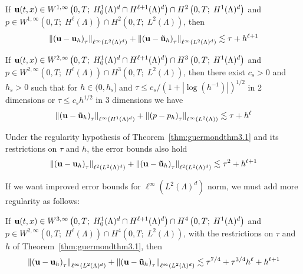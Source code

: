 \documentclass[letterpaper]{erdc}
\begin{document}
\begin{theorem}\label{thm:guermondthm3.1}
If $\textbf{u}(t,x)\in W^{1,\infty}\left(0,T;\; H_0^1(\Lambda)^d \cap H^{\ell+1}(\Lambda)^d  \right) \cap H^2\left(0,T;\; H^1(\Lambda)^d\right)$ and $p\in W^{1,\infty}\left(0,T;\; H^{\ell}(\Lambda) \right)\cap H^2\left(0,T;\; L^2(\Lambda)\right)$, then
  \begin{equation}
    \left\| \left(\textbf{u} - \textbf{u}_h \right)_{\tau} \right\|_{\ell^{\infty}\left(L^2(\Lambda)^d\right)} + \left\| \left(\textbf{u} - \mathbf{\tilde{u}}_h \right)_{\tau} \right\|_{\ell^{\infty}\left(L^2(\Lambda)^d\right)} \lesssim \tau + h^{\ell+1}
  \end{equation}
\end{theorem}

\begin{theorem}\label{thm:guermondthm3.2}
If $\textbf{u}(t,x)\in W^{2,\infty}\left(0,T;\; H_0^1(\Lambda)^d \cap H^{\ell+1}(\Lambda)^d  \right) \cap H^3\left(0,T;\; H^1(\Lambda)^d\right)$ and $p\in W^{2,\infty}\left(0,T;\; H^{\ell}(\Lambda) \right)\cap H^3\left(0,T;\; L^2(\Lambda)\right)$, then there exist $c_s>0$ and $h_s>0$ such that for $h\in (0,h_s]$ and $\tau \leq c_s /\left(1+|\log(h^{-1})| \right)^{1/2}$ in 2 dimensions or $\tau \leq c_s h^{1/2}$ in 3 dimensions we have
  \begin{equation}
    \left\| \left(\textbf{u} - \mathbf{\tilde{u}}_h \right)_{\tau} \right\|_{\ell^{\infty}\left(H^1(\Lambda)^d\right)} + \left\| \left(p - p_h \right)_{\tau} \right\|_{\ell^{\infty}\left(L^2(\Lambda)\right)} \lesssim \tau + h^{\ell}
  \end{equation}
\end{theorem}

\begin{theorem}\label{thm:guermondthm3.3}
  Under the regularity hypothesis of Theorem~\ref{thm:guermondthm3.1} and its
  restrictions on $\tau$ and $h$, the error bounds also hold
    \begin{equation}
      \left\| \left(\textbf{u} - \textbf{u}_h \right)_{\tau} \right\|_{\ell^{2}\left(L^2(\Lambda)^d\right)} + \left\| \left(\textbf{u} - \mathbf{\tilde{u}}_h \right)_{\tau} \right\|_{\ell^{2}\left(L^2(\Lambda)^d\right)} \lesssim \tau^2 + h^{\ell+1}
    \end{equation}
\end{theorem}

If we want improved error bounds for
$\ell^{\infty}\left( L^2(\Lambda)^d \right)$ norm, we must add more regularity
as follows:
\begin{theorem}\label{thm:guermondthm3.4}
If $\textbf{u}(t,x)\in W^{3,\infty}\left(0,T;\; H_0^1(\Lambda)^d \cap H^{\ell+1}(\Lambda)^d  \right) \cap H^4\left(0,T;\; H^1(\Lambda)^d\right)$ and $p\in W^{2,\infty}\left(0,T;\; H^{\ell}(\Lambda) \right)\cap H^4\left(0,T;\; L^2(\Lambda)\right)$, with the restrictions on $\tau$ and $h$ of Theorem~\ref{thm:guermondthm3.1}, then
  \begin{equation}
    \left\| \left(\textbf{u} - \textbf{u}_h \right)_{\tau} \right\|_{\ell^{\infty}\left(L^2(\Lambda)^d\right)} + \left\| \left(\textbf{u} - \mathbf{\tilde{u}}_h \right)_{\tau} \right\|_{\ell^{\infty}\left(L^2(\Lambda)^d\right)} \lesssim \tau^{7/4} + \tau^{3/4}h^{\ell} + h^{\ell+1}
  \end{equation}
\end{theorem}
\end{document}
